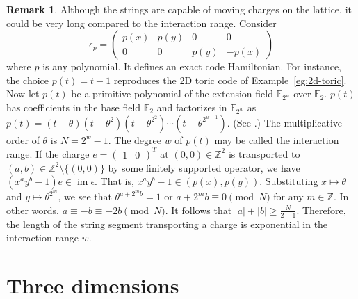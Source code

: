 \documentclass[letterpaper,12pt]{amsart}
\theoremstyle{definition} \newtheorem{defn}{Definition}
\theoremstyle{definition} \newtheorem{rem}{Remark}
\theoremstyle{definition} \newtheorem{example}{Example}
\newcommand{\im}{\mathop{\mathrm{im}}}
\newcommand{\FF}{\mathbb{F}}
\newcommand{\ZZ}{\mathbb{Z}}
\begin{document}
\begin{rem}
Although the strings are capable of moving charges on the lattice,
it could be very long compared to the interaction range.
Consider
\[
 \epsilon_p = 
\begin{pmatrix}
 p(x) & p(y) & 0         & 0          \\
 0    & 0    & p(\bar y) & -p(\bar x)
\end{pmatrix}
\]
where $p$ is any polynomial. It defines an exact code Hamiltonian.
For instance, the choice $p(t) = t-1$ reproduces the 2D toric code of Example~\ref{eg:2d-toric}.
Now let $p(t)$ be a primitive polynomial of the extension field $\FF_{2^w}$ over $\FF_2$.
$p(t)$ has coefficients in the base field $\FF_2$ and factorizes in $\FF_{2^w}$
as $p(t) = (t-\theta)(t-\theta^2)(t-\theta^{2^2})\cdots(t-\theta^{2^{w-1}})$.
(See \cite[Chapter~V Section~5]{Lang}.)
The multiplicative order of $\theta$ is $N = 2^w -1$.
The degree $w$ of $p(t)$ may be called the interaction range.
If the charge $e = \begin{pmatrix}1 & 0 \end{pmatrix}^T$ at $(0,0)\in \ZZ^2$
is transported to $(a,b) \in \ZZ^2 \setminus \{ (0,0) \}$ by some finitely supported operator,
we have $(x^a y^b -1)e \in \im \epsilon$.
That is, $x^a y^b -1 \in (p(x),p(y))$.
Substituting $x \mapsto \theta$ and $y \mapsto \theta^{2^m}$,
we see that $\theta^{a+2^m b} = 1$ or $a+2^m b \equiv 0 \pmod N$ for any $m \in \ZZ$.
In other words, $a \equiv -b \equiv -2b \pmod N$. It follows that $|a| + |b| \ge \frac{N}{2-1}$.
Therefore, the length of the string segment transporting a charge is exponential in the interaction range $w$.
\end{rem}


\section{Three dimensions}
\label{sec:3d}
\end{document}
